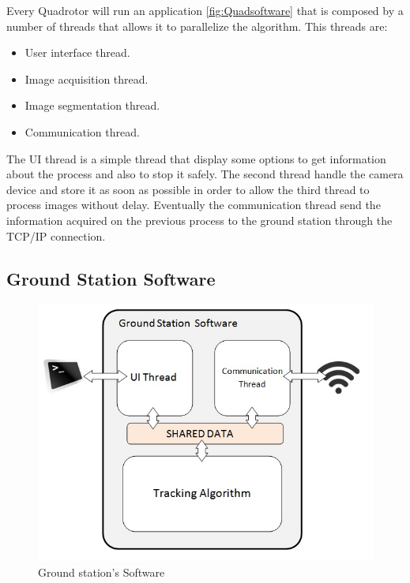	Every Quadrotor will run an application \ref{fig:Quadsoftware} that is composed by a number of threads that allows it to parallelize the algorithm. This threads are:
	
	
	\begin{itemize}
		\item User interface thread.
		\item Image acquisition thread.
		\item Image segmentation thread.
		\item Communication thread.
	\end{itemize}
	
	
	
	The UI thread is a simple thread that display some options to get information about the process and also to stop it safely. The second thread handle the camera device and store it as soon as possible in order to allow the third thread to process images without delay. Eventually the communication thread send the information acquired on the previous process to the ground station through the TCP/IP connection.
	
\subsection{Ground Station Software}
	\begin{figure}
		\begin{center}
			\includegraphics[width=\linewidth]{../Images/c2/GroundStationsoftware}
		\end{center}
		\caption{Ground station's Software}
		\label{fig:GroundStation}
	\end{figure}

